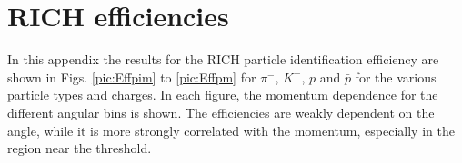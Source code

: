 
\chapter{RICH efficiencies}\label{app:RICH}


In this appendix the results for the RICH particle identification efficiency are shown in Figs. \ref{pic:Effpim} to \ref{pic:Effpm} for $\pi^-$, $K^-$, $p$ and $\bar{p}$ for the various particle types and charges. In each figure, the momentum dependence for the different angular bins is shown. The efficiencies are weakly dependent on the angle, while it is more strongly correlated with the momentum, especially in the region near the threshold.


